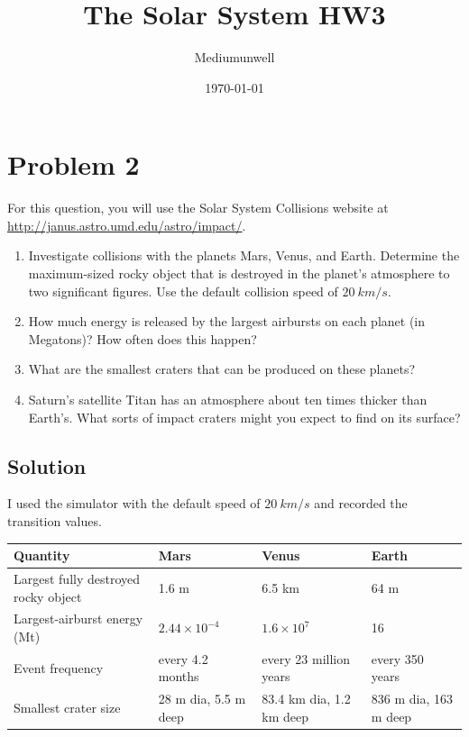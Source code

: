 \documentclass[11pt]{article}
\title{The Solar System HW3}
\author{Mediumunwell}
\date{\today}
\begin{document}
\maketitle

\section*{Problem 2}
For this question, you will use the Solar System Collisions website at
\url{http://janus.astro.umd.edu/astro/impact/}.
\begin{enumerate}[label=(\alph*)]
\item Investigate collisions with the planets Mars, Venus, and Earth. Determine the maximum-sized
rocky object that is destroyed in the planet's atmosphere to two significant figures.
Use the default collision speed of $\SI{20}{km/s}$.
\item How much energy is released by the largest airbursts on each planet (in Megatons)?
How often does this happen?
\item What are the smallest craters that can be produced on these planets?
\item Saturn's satellite Titan has an atmosphere about ten times thicker than Earth's.
What sorts of impact craters might you expect to find on its surface?
\end{enumerate}

\subsection*{Solution}
I used the simulator with the default speed of $\SI{20}{km/s}$ and recorded the transition values.

\begin{center}
\begin{tabular}{p{}p{}p{}p{}}
\hline
Quantity & Mars & Venus & Earth \\
\hline
Largest fully destroyed rocky object & 1.6 m & 6.5 km & 64 m \\
Largest-airburst energy (Mt) & $2.44\times10^{-4}$ & $1.6\times10^{7}$ & 16 \\
Event frequency & every 4.2 months & every 23 million years & every 350 years \\
Smallest crater size & 28 m dia, 5.5 m deep & 83.4 km dia, 1.2 km deep & 836 m dia, 163 m deep \\
\hline
\end{tabular}
\end{center}
\end{document}
